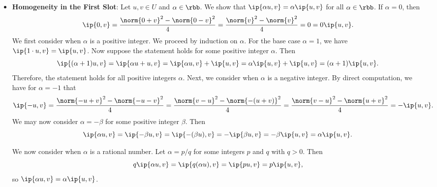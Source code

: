 \begin{sol}
\begin{itemize}
\[        \]
        \item \textbf{Homogeneity in the First Slot}: Let $u, v \in U$ and $\alpha \in \rbb$.
        We show that $\ip{\alpha u, v} = \alpha \ip{u, v}$ for all $\alpha \in \rbb$.
        If $\alpha = 0$, then
        \[
            \ip{0, v} = \frac{\norm{0 + v}^2 - \norm{0 - v}^2}{4} = \frac{\norm{v}^2 - \norm{v}^2}{4} = 0 = 0\ip{u, v}.
        \]
        We first consider when $\alpha$ is a positive integer.
        We proceed by induction on $\alpha$.
        For the base case $\alpha = 1$, we have $\ip{1\cdot u, v} = \ip{u, v}$.
        Now suppose the statement holds for some positive integer $\alpha$.
        Then
        \[
            \ip{(\alpha + 1)u, v} = \ip{\alpha u + u, v} = \ip{\alpha u, v} + \ip{u, v} = \alpha\ip{u, v} + \ip{u, v} = (\alpha + 1)\ip{u, v}.
        \]
        Therefore, the statement holds for all positive integers $\alpha$.
        Next, we consider when $\alpha$ is a negative integer.
        By direct computation, we have for $\alpha = -1$ that
        \[
            \ip{-u, v} = \frac{\norm{-u + v}^2 - \norm{-u - v}^2}{4} = \frac{\norm{v - u}^2 - \norm{-(u + v)}^2}{4} = \frac{\norm{v - u}^2 - \norm{u + v}^2}{4} = -\ip{u, v}.
        \]
        We may now consider $\alpha = -\beta$ for some positive integer $\beta$.
        Then
        \[
            \ip{\alpha u, v} = \ip{-\beta u, v} = \ip{-(\beta u), v} = -\ip{\beta u, v} = -\beta\ip{u, v} = \alpha\ip{u, v}.
        \]

        We now consider when $\alpha$ is a rational number.
        Let $\alpha = p/q$ for some integers $p$ and $q$ with $q > 0$.
        Then
        \[
            q\ip{\alpha u, v} = \ip{q(\alpha u), v} = \ip{p u, v} = p\ip{u, v},
        \]
        so $\ip{\alpha u, v} = \alpha\ip{u, v}$.
        

\end{itemize}
\end{sol}
